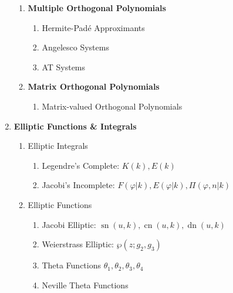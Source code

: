 \begin{enumerate}[label=\textbf{\arabic*.}]
\begin{enumerate}[label=\textbf{\alph*)}]
		\item \textbf{Multiple Orthogonal Polynomials}
		\begin{enumerate}[label=\textbf{\roman*)}]
			\item Hermite-Padé Approximants
			\item Angelesco Systems
			\item AT Systems
		\end{enumerate}
		
		\item \textbf{Matrix Orthogonal Polynomials}
		\begin{enumerate}[label=\textbf{\roman*)}]
			\item Matrix-valued Orthogonal Polynomials
		\end{enumerate}
	\end{enumerate}
	
	\item \textbf{Elliptic Functions \& Integrals}
	\begin{enumerate}[label=\textbf{\alph*)}]
		\item Elliptic Integrals
		\begin{enumerate}[label=\textbf{\roman*)}]
			\item Legendre's Complete: $K(k), E(k)$
			\item Jacobi's Incomplete: $F(\varphi|k), E(\varphi|k), \Pi(\varphi,n|k)$
		\end{enumerate}
		\item Elliptic Functions
		\begin{enumerate}[label=\textbf{\roman*)}]
			\item Jacobi Elliptic: $\operatorname{sn}(u,k), \operatorname{cn}(u,k), \operatorname{dn}(u,k)$
			\item Weierstrass Elliptic: $\wp(z;g_2,g_3)$
			\item Theta Functions $\theta_1, \theta_2, \theta_3, \theta_4$
			\item Neville Theta Functions
		\end{enumerate}
	\end{enumerate}
	

\end{enumerate}
